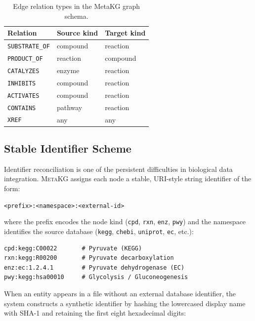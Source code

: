 \documentclass[10pt]{article}
\begin{document}
\begin{table}[H]
  \centering
  \caption{Edge relation types in the MetaKG graph schema.}
  \label{tab:relations}
  \small
  \begin{tabular}{@{}lll@{}}
    \toprule
    Relation & Source kind & Target kind \\
    \midrule
    \texttt{SUBSTRATE\_OF}  & compound  & reaction  \\
    \texttt{PRODUCT\_OF}    & reaction  & compound  \\
    \texttt{CATALYZES}      & enzyme    & reaction  \\
    \texttt{INHIBITS}       & compound  & reaction  \\
    \texttt{ACTIVATES}      & compound  & reaction  \\
    \texttt{CONTAINS}       & pathway   & reaction  \\
    \texttt{XREF}           & any       & any       \\
    \bottomrule
  \end{tabular}
\end{table}

\subsection{Stable Identifier Scheme}

Identifier reconciliation is one of the persistent difficulties in biological
data integration. \textsc{MetaKG} assigns each node a stable, URI-style
string identifier of the form:

\begin{center}
\texttt{<prefix>:<namespace>:<external-id>}
\end{center}

\noindent where the prefix encodes the node kind (\texttt{cpd}, \texttt{rxn},
\texttt{enz}, \texttt{pwy}) and the namespace identifies the source database
(\texttt{kegg}, \texttt{chebi}, \texttt{uniprot}, \texttt{ec}, etc.):

\begin{lstlisting}[style=python, caption={Examples of stable node identifiers.}]
cpd:kegg:C00022       # Pyruvate (KEGG)
rxn:kegg:R00200       # Pyruvate decarboxylation
enz:ec:1.2.4.1        # Pyruvate dehydrogenase (EC)
pwy:kegg:hsa00010     # Glycolysis / Gluconeogenesis
\end{lstlisting}

When an entity appears in a file without an external database identifier, the
system constructs a synthetic identifier by hashing the lowercased display name
with SHA-1 and retaining the first eight hexadecimal digits:
\end{document}
